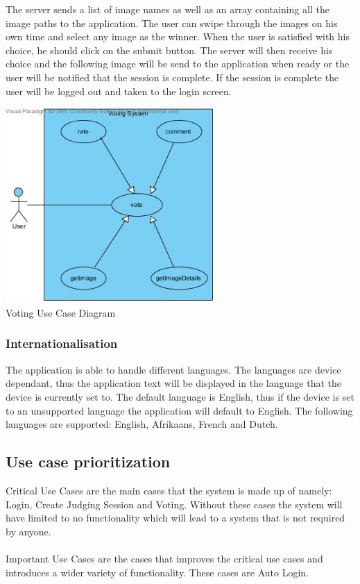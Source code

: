 \documentclass[10pt,a4paper]{article}
\begin{document}
The server sends a list of image names as well as an array containing all the image paths to the application. The user can swipe through the images on his own time and select any image as the winner. When the user is satisfied with his choice, he should click on the submit button. The server will then receive his choice and the following image will be send to the application when ready or the user will be notified that the session is complete. If the session is complete the user will be logged out and taken to the login screen.
\\  
\begin{center}
\advance{}
\includegraphics[width=80mm]{Pictures/Vote.jpg} \\
Voting Use Case Diagram 
\end{center}

\subsubsection{Internationalisation}
The application is able to handle different languages. The languages are device dependant, thus the application text will be displayed in the language that the device is currently set to. The default language is English, thus if the device is set to an unsupported language the application will default to English. The following languages are supported: English, Afrikaans, French and Dutch.

\subsection{Use case prioritization}
Critical Use Cases are the main cases that the system is made up of namely: Login, Create Judging Session and Voting. Without these cases the system will have limited to no functionality which will lead to a system that is not required by anyone.
\\ \\
Important Use Cases are the cases that improves the critical use cases and introduces a wider variety of functionality. These cases are Auto Login.
\end{document}
